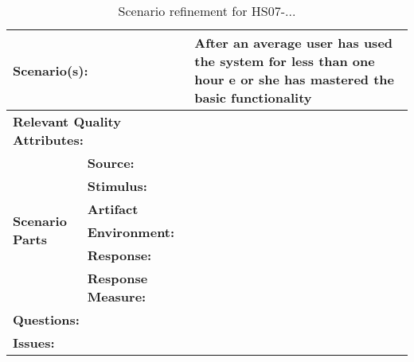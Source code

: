 \documentclass[10pt,a4paper]{article}
\begin{document}
\begin{table}[!htp]
\begin{center}
\begin{tabular}{|p{0.3cm}|p{2.5cm}|p{8cm}|}
  \hline
  \multicolumn{2}{|p{3cm}|}{\bfseries Scenario(s):} & After an average user has used the system for less than one hour e or she has mastered the basic functionality \\
  \hline
  \multicolumn{2}{|p{3cm}|}{\bfseries Relevant Quality Attributes:} usability & \\
  \hline
  \multirow{6}{*}{\begin{sideways}{\bfseries Scenario Parts}\end{sideways}}
  & {\bfseries Source:} &  \\
  \cline{2-3}
  & {\bfseries Stimulus:} &  \\
  \cline{2-3}
  & {\bfseries Artifact} &  \\
  \cline{2-3}
  & {\bfseries Environment:} &  \\
  \cline{2-3}
  & {\bfseries Response:} &  \\
  \cline{2-3}
  & {\bfseries Response Measure:} & \\
  \hline
  \multicolumn{2}{|p{3cm}|}{\bfseries Questions:} &  \\
  \hline
  \multicolumn{2}{|p{3cm}|}{\bfseries Issues:} &  \\
  \hline
\end{tabular}
\caption{Scenario refinement for HS07-...}
\end{center}
\end{table}
\end{document}
